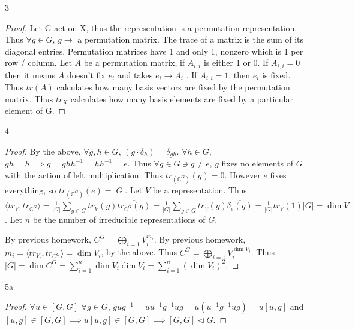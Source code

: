 \documentclass{article}
\newcommand{\C}{\mathbb{C}}
\newcommand{\angles}[1]{\langle #1 \rangle}
\begin{document}
\bigskip

\begin{PROB}{3}\label{Problem 3.}
    
\end{PROB}
\begin{proof}
    Let G act on X, thus the representation is a permutation representation. Thus $\forall g \in G$, $g \to $ a permutation matrix. The trace of a matrix is the sum of its diagonal entries. Permutation matrices have 1 and only 1, nonzero which is 1 per row / column. Let $A$ be a permutation matrix, if $A_{i, i}$ is either 1 or 0. If $A_{i, i} = 0$ then it means $A$ doesn't fix $e_i$ and takes $e_i \to A_i$ . If $A_{i, i} = 1$, then $e_i$ is fixed. Thus $tr(A)$ calculates how many basis vectors are fixed by the permutation matrix. Thus $tr_{X}$ calculates how many basis elements are fixed by a particular element of G.
\end{proof}

\bigskip

\begin{PROB}{4}\label{Problem 4.}
    
\end{PROB}
\begin{proof}
    By the above, $\forall g, h \in G$, $(g \cdot \delta_h) = \delta_{gh}$. $\forall h \in G$, $gh = h \implies g =  ghh^{-1}= h h^{-1} = e$. Thus $\forall g \in G \ni g \neq e$, $g$ fixes no elements of $G$ with the action of left multiplication. Thus $tr_(\C^{G})(g) = 0$. However $e$ fixes everything, so $tr_(\C^{G})(e) = |G|$. Let $V$ be a representation. Thus $\angles{tr_V, tr_{\C^{G}}} = \frac{1}{|G|} \sum_{g \in G} tr_{V}(g) \overline{tr_{\C^{G}}(g)} =\frac{1}{|G|} \sum_{g \in G} tr_{V}(g) \overline{\delta_{e}(g)} = \frac{1}{|G|} tr_{V}(1) |G| = \dim V$. Let $n$ be the number of irreducible representations of $G$. 
    
    By previous homework, $C^{G} = \bigoplus_{i = 1} V_i^{m_i}$. By previous homework, $m_i = \angles{tr_{V_i}, tr_{C^{G}}} = \dim V_i$, by the above. Thus $C^{G} = \bigoplus_{i = 1} V_i^{\dim V_i}$. Thus $|G| = \dim C^{G} = \sum_{i = 1}^{n} \dim V_i \dim V_i = \sum_{i = 1}^{n} \left(\dim V_i\right)^2$.  
\end{proof}

\bigskip

\begin{PROB}{5a}\label{Problem 5a.}
    
\end{PROB}
\begin{proof}
    $\forall u \in [G, G]$ $\forall g \in G$, $gug^{-1} = u u^{-1} g^{-1} u g = u(u^{-1} g^{-1} u g ) = u [u , g]$ and $[u, g] \in [G, G] \implies u[u, g] \in [G , G] \implies [G, G] \triangleleft G$.    
\end{proof}
\end{document}
